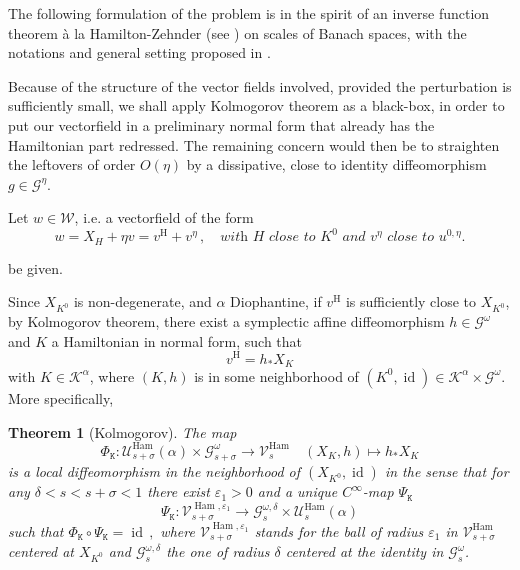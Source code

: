 \documentclass[oneside, 11pt]{amsbook}
\newcommand{\G}{\mathcal{G}}
\newcommand{\U}{\mathcal{U}}
\newcommand{\eps}{\varepsilon}
\newcommand{\vh}{v^{\text{H}}} %
\newcommand{\Uh}{\mathcal{U}^{\operatorname{Ham}}}
\newcommand{\Vh}{\mathcal{V}^{\operatorname{Ham}}}
\newcommand{\id}{\operatorname{id}}
\def\U{{\mathcal U}}
\newcommand{\cG}{{\mathcal G}}
\newcommand{\cK}{{\mathcal K}}
\newcommand{\cW}{{\mathcal W}}
\newcommand{\tK}{{\mathtt{K}}}
\newcommand{\0}{{(0)}}
\newcommand{\3}{{(3)}}
\newtheorem{thm}{Theorem}[section]
\numberwithin{equation}{section}
\numberwithin{defn}{section}
\numberwithin{prop}{section}
\numberwithin{cor}{section}
\numberwithin{lemma}{section}
\numberwithin{rmk}{section}
\numberwithin{corollary}{section}
\begin{document}
The following formulation of the problem is in the spirit of an inverse function theorem à la Hamilton-Zehnder (see \cite{Zehnder:1975}) on scales of Banach spaces, with the notations and general setting proposed in \cite{Massetti:ETDS,Fejoz:2015}.

Because of the structure of the vector fields involved, provided the perturbation is sufficiently small, we shall apply Kolmogorov theorem as a black-box, in order to put our vectorfield in a preliminary normal form that already has the Hamiltonian part redressed. The remaining concern would then be to straighten the leftovers of order $O(\eta)$ by a dissipative, close to identity diffeomorphism $g\in\cG^\eta$.



\medskip

Let $w \in \cW$, i.e. a vectorfield of the form 
\begin{equation}\label{perturbed vf}
w= X_H + \eta v = \vh + v^\eta\,, \quad \textit{with $H$  close to $K^0$ and $v^\eta$ close to $u^{0,\eta}$.}
\end{equation}

be given.

\medskip

{Since $X_{K^0}$ is non-degenerate, and $\alpha$ Diophantine, if $\vh$ is sufficiently close to $X_{K^0}$, by Kolmogorov theorem, there exist a symplectic affine diffeomorphism $h\in\cG^\omega$ and $K$ a Hamiltonian in normal form,  such that 
\begin{equation}\label{hamiltonian conj}
\vh =  h_*X_K
\end{equation}
 with $K\in\cK^\alpha$, where $(K, h)$ is in some  neighborhood of $({K^0}, \id)\in\cK^\alpha\times\cG^\omega$. }  \\

More specifically,

\begin{thm}[Kolmogorov] 
\label{Kolmogorov}
The map
 $$
 \Phi_{\tK}: \Uh_{s+\sigma}(\alpha) \times \cG^{\omega}_{s+\sigma} \to \Vh_{s} \quad (X_{K},h)\mapsto h_{*}X_{K} 
 $$
 is a local diffeomorphism in the neighborhood of $(X_{K^{0}},\id)$ in the sense that 
 for any $\delta< s <s+\sigma<1$ there exist $\eps_{1}>0$ and a unique $C^\infty$-map $\Psi_\tK$ $$\Psi_\tK : \mathcal{V}^{\operatorname{Ham}, \eps_{1}}_{s+\sigma}\to \G^{\omega,\delta}_{s}\times\Uh_s(\alpha)$$ such that $\Phi_{\tK}\circ\Psi_\tK = \id\,,$
 where  $ \mathcal{V}^{\operatorname{Ham}, \eps_{1}}_{s+\sigma}$ stands for the ball of radius $\eps_1$ in $\Vh_{s+\sigma}$ centered at $X_{K^0}$ and $\G^{\omega,\delta}_{s}$ the one of radius $\delta$ centered at the identity in $\G^\omega_s$.
 \end{thm}
 
\end{document}
